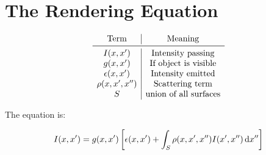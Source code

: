 \documentclass{article}
\renewcommand{\d}[1]{\,\textnormal{d}#1}
\begin{document}
\section*{The Rendering Equation}

\[
\begin{array}{c|c}
\text{Term} & \text{Meaning} \\
\midrule
I(x, x') & \text{Intensity passing} \\
g(x, x') & \text{If object is visible} \\
\epsilon(x,x') & \text{Intensity emitted} \\
\rho(x,x',x'') & \text{Scattering term} \\
S & \text{union of all surfaces} \\
\end{array}
\]

The equation is:

\[
I(x,x')=g(x,x')\left\lbrack\epsilon(x,x')+\int_S \rho(x,x',x'')I(x',x'')\d{x''}\right\rbrack
\]
\end{document}

